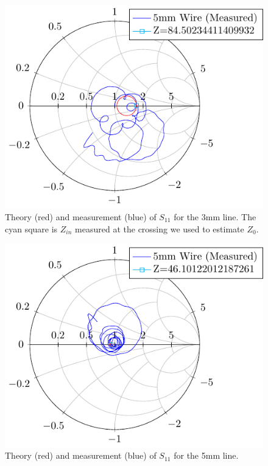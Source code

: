 \documentclass{article}
\begin{document}
\begin{figure}
    \centering
    \includegraphics{figures/build/smith_3mm.pdf}
    \caption{Theory (red) and measurement (blue) of $S_{11}$ for the 3mm line. The cyan square is $Z_{in}$ measured at the crossing we used to estimate $Z_0$.}
    \label{fig:smith_chart_3mm}
\end{figure}


\begin{figure}
    \centering
    \includegraphics{figures/build/smith_5mm.pdf}
    \caption{Theory (red) and measurement (blue) of $S_{11}$ for the 5mm line.}
    \label{fig:smith_chart_3mm}
\end{figure}
\end{document}
